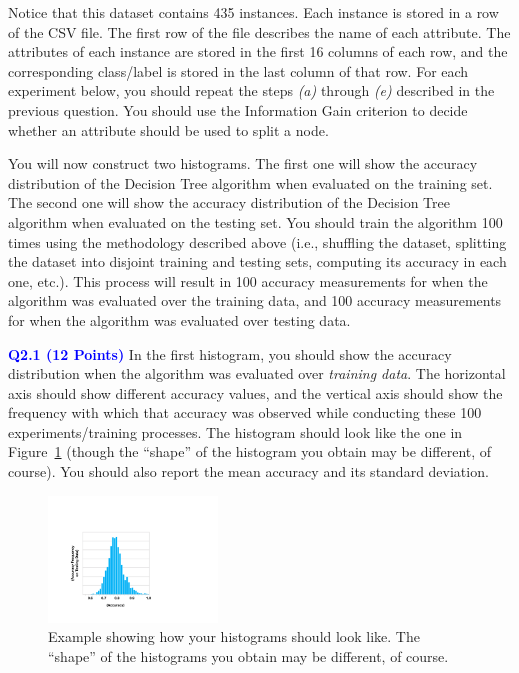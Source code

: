 \documentclass[]{article}
\newcommand{\HIGHLIGHT}[1]{\textcolor{blue}{\textbf{#1}}}
\begin{document}
\begin{enumerate}
    Notice that this dataset contains 435 instances. Each instance is stored in a row of the CSV file. The first row of the file describes the name of each attribute. The attributes of each instance are stored in the first 16 columns of each row, and the corresponding class/label is stored in the last column of that row. For each experiment below, you should repeat the steps \textit{(a)} through \textit{(e)} described in the previous question. You should use the Information Gain criterion to decide whether an attribute should be used to split a node.

    You will now construct two histograms. The first one will show the accuracy distribution of the Decision Tree algorithm when evaluated on the training set. The second one will show the accuracy distribution of the Decision Tree algorithm when evaluated on the testing set. You should train the algorithm 100 times using the methodology described above (i.e., shuffling the dataset, splitting the dataset into disjoint training and testing sets, computing its accuracy in each one, etc.). This process will result in 100 accuracy measurements for when the algorithm was evaluated over the training data, and 100 accuracy measurements for when the algorithm was evaluated over testing data. 
    
    
    \vspace{0.3in}
    
    \HIGHLIGHT{Q2.1 (12 Points)} In the first histogram, you should show the accuracy distribution when the algorithm was evaluated over \textit{training data}. The horizontal axis should show different accuracy values, and the vertical axis should show the frequency with which that accuracy was observed while conducting these 100 experiments/training processes. The histogram should look like the one in Figure~\ref{fig:sample_histogram} (though the ``shape'' of the histogram you obtain may be different, of course). You should also report the mean accuracy and its standard deviation.
    \begin{figure}[ht!]
        \centering
        \includegraphics[width=0.4\textwidth]{figures/example_histogram.pdf}
        \caption{Example showing how your histograms should look like. The ``shape'' of the histograms you obtain may be different, of course.}
        \label{fig:sample_histogram}
    \end{figure} 


\end{enumerate}
\end{document}
